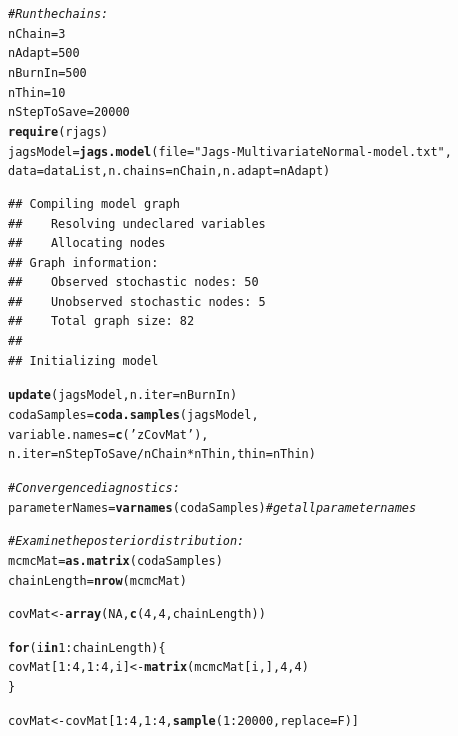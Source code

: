 \documentclass[11pt,a4paper,twoside]{book}
\makeatletter
\newcommand{\hlnum}[1]{\textcolor[rgb]{0.686,0.059,0.569}{#1}}%
\newcommand{\hlstr}[1]{\textcolor[rgb]{0.192,0.494,0.8}{#1}}%
\newcommand{\hlcom}[1]{\textcolor[rgb]{0.678,0.584,0.686}{\textit{#1}}}%
\newcommand{\hlopt}[1]{\textcolor[rgb]{0,0,0}{#1}}%
\newcommand{\hlstd}[1]{\textcolor[rgb]{0.345,0.345,0.345}{#1}}%
\newcommand{\hlkwa}[1]{\textcolor[rgb]{0.161,0.373,0.58}{\textbf{#1}}}%
\newcommand{\hlkwb}[1]{\textcolor[rgb]{0.69,0.353,0.396}{#1}}%
\newcommand{\hlkwc}[1]{\textcolor[rgb]{0.333,0.667,0.333}{#1}}%
\newcommand{\hlkwd}[1]{\textcolor[rgb]{0.737,0.353,0.396}{\textbf{#1}}}%
\newenvironment{kframe}{%
 \def\at@end@of@kframe{}%
 \ifinner\ifhmode%
  \def\at@end@of@kframe{\end{minipage}}%
  \begin{minipage}{\columnwidth}%
 \fi\fi%
 \def\FrameCommand##1{\hskip\@totalleftmargin \hskip-\fboxsep
 \colorbox{shadecolor}{##1}\hskip-\fboxsep
     \hskip-\linewidth \hskip-\@totalleftmargin \hskip\columnwidth}%
 \MakeFramed {\advance\hsize-\width
   \@totalleftmargin\z@ \linewidth\hsize
   \@setminipage}}%
 {\par\unskip\endMakeFramed%
 \at@end@of@kframe}
\newenvironment{knitrout}{}{} %
\makeatother
\begin{document}
\begin{knitrout}
\begin{kframe}
\begin{alltt}
\hlcom{# Run the chains:}
\hlstd{nChain} \hlkwb{=} \hlnum{3}
\hlstd{nAdapt} \hlkwb{=} \hlnum{500}
\hlstd{nBurnIn} \hlkwb{=} \hlnum{500}
\hlstd{nThin} \hlkwb{=} \hlnum{10}
\hlstd{nStepToSave} \hlkwb{=} \hlnum{20000}
\hlkwd{require}\hlstd{(rjags)}
\hlstd{jagsModel} \hlkwb{=} \hlkwd{jags.model}\hlstd{(} \hlkwc{file}\hlstd{=}\hlstr{"Jags-MultivariateNormal-model.txt"} \hlstd{,}
                                                                                                \hlkwc{data}\hlstd{=dataList ,} \hlkwc{n.chains}\hlstd{=nChain ,} \hlkwc{n.adapt}\hlstd{=nAdapt )}
\end{alltt}
\begin{verbatim}
## Compiling model graph
##    Resolving undeclared variables
##    Allocating nodes
## Graph information:
##    Observed stochastic nodes: 50
##    Unobserved stochastic nodes: 5
##    Total graph size: 82
## 
## Initializing model
\end{verbatim}
\begin{alltt}
\hlkwd{update}\hlstd{( jagsModel ,} \hlkwc{n.iter}\hlstd{=nBurnIn )}
\hlstd{codaSamples} \hlkwb{=} \hlkwd{coda.samples}\hlstd{( jagsModel ,}
                                                                                                                \hlkwc{variable.names}\hlstd{=}\hlkwd{c}\hlstd{(}\hlstr{'zCovMat'}\hlstd{) ,}
                                                                                                                \hlkwc{n.iter}\hlstd{=nStepToSave}\hlopt{/}\hlstd{nChain}\hlopt{*}\hlstd{nThin ,} \hlkwc{thin}\hlstd{=nThin )}


\hlcom{# Convergence diagnostics:}
\hlstd{parameterNames} \hlkwb{=} \hlkwd{varnames}\hlstd{(codaSamples)} \hlcom{# get all parameter names}


\hlcom{# Examine the posterior distribution:}
\hlstd{mcmcMat} \hlkwb{=} \hlkwd{as.matrix}\hlstd{(codaSamples)}
\hlstd{chainLength} \hlkwb{=} \hlkwd{nrow}\hlstd{(mcmcMat)}

\hlstd{covMat} \hlkwb{<-} \hlkwd{array}\hlstd{(}\hlnum{NA}\hlstd{,} \hlkwd{c}\hlstd{(}\hlnum{4}\hlstd{,}\hlnum{4}\hlstd{,chainLength))}

\hlkwa{for} \hlstd{(i} \hlkwa{in} \hlnum{1}\hlopt{:}\hlstd{chainLength)\{}
\hlstd{covMat[}\hlnum{1}\hlopt{:}\hlnum{4}\hlstd{,}\hlnum{1}\hlopt{:}\hlnum{4}\hlstd{,i]}\hlkwb{<-}\hlkwd{matrix}\hlstd{(mcmcMat[i,],} \hlnum{4}\hlstd{,} \hlnum{4}\hlstd{)}
\hlstd{\}}

\hlstd{covMat} \hlkwb{<-} \hlstd{covMat[}\hlnum{1}\hlopt{:}\hlnum{4}\hlstd{,}\hlnum{1}\hlopt{:}\hlnum{4}\hlstd{,}\hlkwd{sample}\hlstd{(}\hlnum{1}\hlopt{:}\hlnum{20000}\hlstd{,} \hlkwc{replace}\hlstd{=F)]}



\end{alltt}
\end{kframe}
\end{knitrout}
\end{document}

